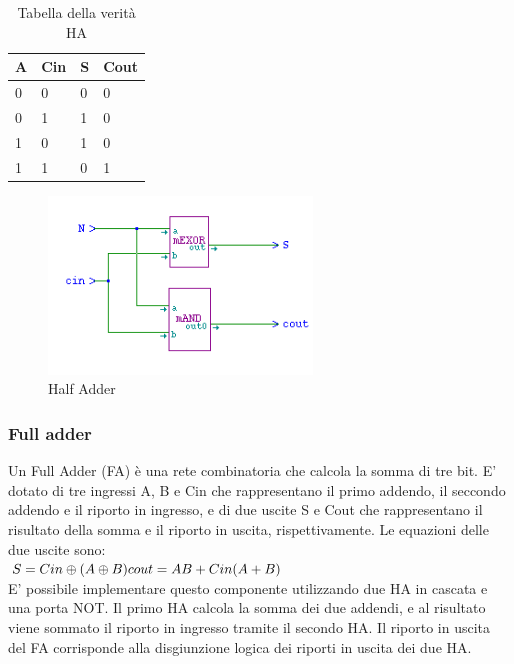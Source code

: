 \documentclass[10pt]{article}
\begin{document}
\begin{itemize}
\begin{table}[H]
    \begin{minipage}[b]{\textwidth}
    \centering
    \begin{tabular}{|l|l|l|l|}
        \hline
        \textbf{A} & \textbf{Cin} & \textbf{S} & \textbf{Cout} \\ \hline
        0          & 0            & 0          & 0             \\ 
        0          & 1            & 1          & 0             \\ 
        1          & 0            & 1          & 0             \\ 
        1          & 1            & 0          & 1             \\ \hline
        \end{tabular}
        \caption{Tabella della verità HA}
        \label{table:student}
    \end{minipage}
    \end{table}
    
    \begin{figure}[H]
    \begin{minipage}[b]{\textwidth}
    \centering
    \includegraphics[width=70mm]{ha}
    \caption{Half Adder}
    \label{ }
    \end{minipage}
    \end{figure}

\subsubsection{Full adder}
Un Full Adder (FA) è una rete combinatoria che calcola la somma di tre bit. E' dotato di tre ingressi A, B e Cin che rappresentano il primo addendo, il seccondo addendo e il riporto
in ingresso, e di due uscite S e Cout che rappresentano il risultato della somma e il riporto in uscita, rispettivamente. 
Le equazioni delle due uscite sono:\\
$
S = Cin \oplus (A \oplus B)\\
cout = AB + Cin(A + B)
$\\
E' possibile implementare questo componente utilizzando due HA in cascata e una porta NOT. Il primo HA calcola la somma dei due addendi, e al risultato viene sommato il riporto in ingresso
tramite il secondo HA.
Il riporto in uscita del FA corrisponde alla disgiunzione logica dei riporti in uscita dei due HA.


\end{itemize}
\end{document}
